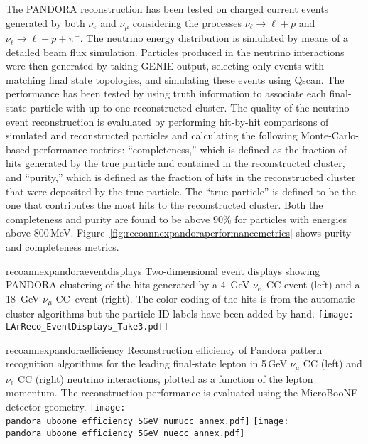The PANDORA reconstruction has been tested on charged current events generated by both $\nu_{e}$  and $\nu_{\mu}$  
considering the processes $\nu_{\ell}\to \ell+p$  and $\nu_{\ell}\to \ell+p+\pi^{+}$.
The neutrino energy distribution is simulated by means of a detailed beam flux simulation.
Particles produced in the neutrino interactions were then generated by taking GENIE output, 
selecting only events with matching final state topologies, 
and simulating these events using Qscan.
 The performance has been tested by using truth information to associate each final-state particle with up to one reconstructed cluster.
The quality of the neutrino event reconstruction 
is evalulated by performing hit-by-hit comparisons of simulated and 
reconstructed particles and calculating the following Monte-Carlo-based performance metrics: 
``completeness,'' which is defined as the fraction of hits generated by 
the true particle and contained in the reconstructed cluster, and  
``purity,'' which is defined as the fraction of hits in the reconstructed 
cluster that were deposited by the true particle.   The ``true particle'' is defined to be the
one that contributes the most hits to the reconstructed cluster.
Both the completeness and purity are found to be above 90$\%$ for 
particles with energies above 800\,MeV.
Figure~\ref{fig:recoannexpandoraperformancemetrics} shows purity and completeness metrics.

\begin{cdrfigure}{recoannexpandoraeventdisplays}
{Two-dimensional event displays showing PANDORA clustering of the hits generated by a 4~GeV $\nu_e$~CC event (left)
and a 18~GeV $\nu_\mu$ CC~event (right).  The color-coding of the hits is from the automatic cluster algorithms
but the particle ID labels have been added by hand.}
\texttt{[image: LArReco\_EventDisplays\_Take3.pdf]}
\end{cdrfigure}

\begin{cdrfigure}{recoannexpandoraefficiency}
{Reconstruction efficiency of Pandora pattern recognition algorithms
 for the leading final-state lepton in 5\,GeV $\nu_{\mu}$ CC (left) and
 $\nu_{e}$ CC (right) neutrino interactions, plotted as a function of
 the lepton momentum. The reconstruction performance is evaluated
 using the MicroBooNE detector geometry. }
\texttt{[image: pandora\_uboone\_efficiency\_5GeV\_numucc\_annex.pdf]}
\texttt{[image: pandora\_uboone\_efficiency\_5GeV\_nuecc\_annex.pdf]}
\end{cdrfigure}

